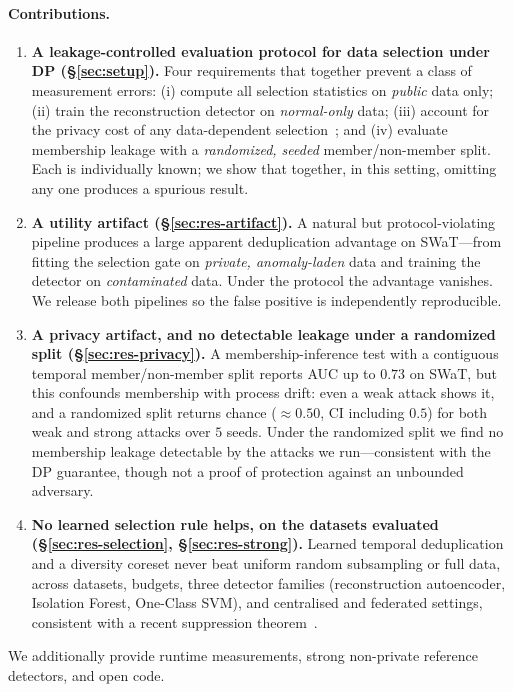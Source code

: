 \documentclass[pdflatex,sn-mathphys-num]{sn-jnl}
\theoremstyle{thmstyleone}
\theoremstyle{thmstyletwo}
\theoremstyle{thmstylethree}
\begin{document}
\paragraph{Contributions.}
\begin{enumerate}
  \item \textbf{A leakage-controlled evaluation protocol for data selection under DP
    (\S\ref{sec:setup}).} Four requirements that together prevent a class of
    measurement errors: (i) compute all selection statistics on \emph{public}
    data only; (ii) train the reconstruction detector on \emph{normal-only} data;
    (iii) account for the privacy cost of any data-dependent
    selection~\cite{nguyen2025coreset}; and (iv) evaluate membership leakage with a
    \emph{randomized, seeded} member/non-member split. Each is individually known; we
    show that together, in this setting, omitting any one produces a spurious result.
  \item \textbf{A utility artifact (\S\ref{sec:res-artifact}).} A natural but
    protocol-violating pipeline produces a large apparent deduplication advantage on
    SWaT---from fitting the selection gate on \emph{private, anomaly-laden} data and
    training the detector on \emph{contaminated} data. Under the protocol the
    advantage vanishes. We release both pipelines so the false positive is
    independently reproducible.
  \item \textbf{A privacy artifact, and no detectable leakage under a randomized split
    (\S\ref{sec:res-privacy}).} A membership-inference test with a contiguous temporal
    member/non-member split reports AUC up to $0.73$ on SWaT, but this confounds
    membership with process drift: even a weak attack shows it, and a randomized split
    returns chance ($\approx0.50$, CI including $0.5$) for both weak and strong
    attacks over $5$ seeds. Under the randomized split we find no membership leakage
    detectable by the attacks we run---consistent with the DP guarantee, though not a
    proof of protection against an unbounded adversary.
  \item \textbf{No learned selection rule helps, on the datasets evaluated
    (\S\ref{sec:res-selection}, \S\ref{sec:res-strong}).} Learned temporal
    deduplication and a diversity coreset never beat uniform random subsampling or
    full data, across datasets, budgets, three detector families (reconstruction
    autoencoder, Isolation Forest, One-Class SVM), and centralised and federated
    settings, consistent with a recent suppression
    theorem~\cite{stoddard2026suppress,nguyen2025coreset,ayle2023bagging}.
\end{enumerate}
We additionally provide runtime measurements, strong non-private reference
detectors, and open code.
\end{document}
